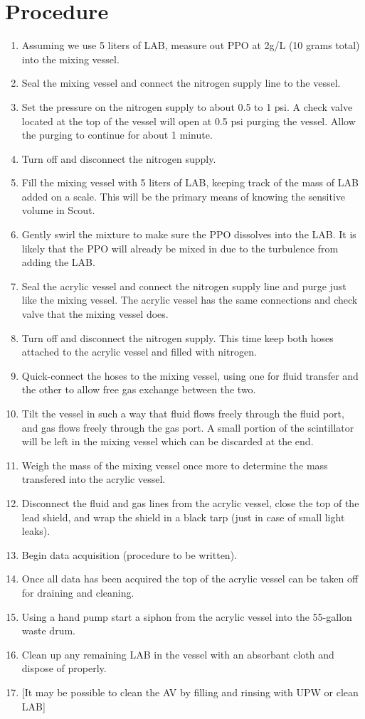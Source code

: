 \documentclass[]{article}
\begin{document}
\section{Procedure}
\begin{enumerate}
  \item Assuming we use 5 liters of LAB, measure out PPO at 2g/L (10 grams total) into the
    mixing vessel.
  \item Seal the mixing vessel and connect the nitrogen supply line to the vessel.
  \item Set the pressure on the nitrogen supply to about 0.5 to 1 psi. A check valve
    located at the top of the vessel will open at 0.5 psi purging the vessel. Allow the
    purging to continue for about 1 minute.
  \item Turn off and disconnect the nitrogen supply.
  \item Fill the mixing vessel with 5 liters of LAB, keeping track of the mass of LAB
    added on a scale. This will be the primary means of knowing the sensitive volume in Scout.
  \item Gently swirl the mixture to make sure the PPO dissolves into the LAB. It is likely
    that the PPO will already be mixed in due to the turbulence from adding the LAB.
  \item Seal the acrylic vessel and connect the nitrogen supply line and purge just like the
    mixing vessel. The acrylic vessel has the same connections and check valve that the mixing
    vessel does.
  \item Turn off and disconnect the nitrogen supply. This time keep both hoses attached to the
    acrylic vessel and filled with nitrogen.
  \item Quick-connect the hoses to the mixing vessel, using one for fluid transfer and the
    other to allow free gas exchange between the two.
  \item Tilt the vessel in such a way that fluid flows freely through the fluid port,
    and gas flows freely through the gas port. A small portion of the scintillator will be
    left in the mixing vessel which can be discarded at the end.
  \item Weigh the mass of the mixing vessel once more to determine the mass transfered into
    the acrylic vessel.
  \item Disconnect the fluid and gas lines from the acrylic vessel, close the top of the lead
    shield, and wrap the shield in a black tarp (just in case of small light leaks).
  \item Begin data acquisition (procedure to be written).
  \item Once all data has been acquired the top of the acrylic vessel can be taken off for 
    draining and cleaning.
  \item Using a hand pump start a siphon from the acrylic vessel into the 55-gallon waste
    drum.
  \item Clean up any remaining LAB in the vessel with an absorbant cloth and dispose of
    properly.
  \item {[}It may be possible to clean the AV by filling and rinsing with UPW or clean LAB{]}
\end{enumerate}
\end{document}

